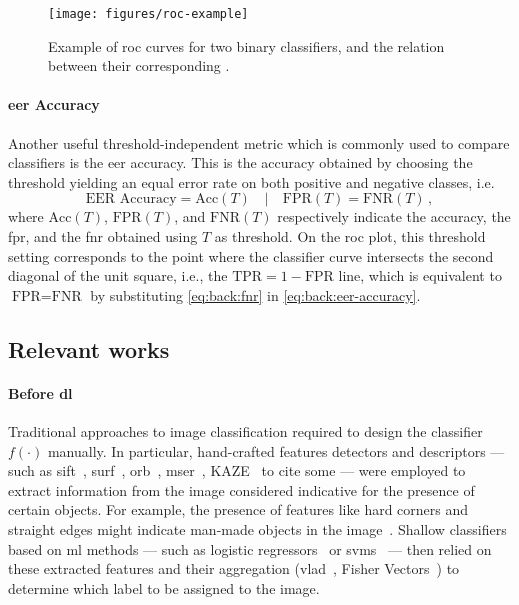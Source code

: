 \begin{figure}
    \centering
    \texttt{[image: figures/roc-example]}
    \caption{Example of \acrfull{roc} curves for two binary classifiers, and the relation between their corresponding .}
    \label{fig:back:roc}
\end{figure}

\paragraph{\acrshort{eer} Accuracy}
Another useful threshold-independent metric which is commonly used to compare classifiers is the \gls{eer} accuracy.
This is the accuracy obtained by choosing the threshold yielding an equal error rate on both positive and negative classes, i.e.
\begin{equation} \label{eq:back:eer-accuracy}
    \text{EER\ Accuracy} = \text{Acc}(T) \quad | \quad \text{FPR}(T) = \text{FNR}(T) \,,
\end{equation}
where $\text{Acc}(T)$, $\text{FPR}(T)$, and $\text{FNR}(T)$ respectively indicate the accuracy, the \gls{fpr}, and the \gls{fnr} obtained using $T$ as threshold.
On the \gls{roc} plot, this threshold setting corresponds to the point where the classifier curve intersects the second diagonal of the unit square, i.e., the $\text{TPR} = 1 - \text{FPR}$ line, which is equivalent to $\text{FPR} = \text{FNR}$ by substituting \ref{eq:back:fnr} in \ref{eq:back:eer-accuracy}.

\subsection{Relevant works}
\label{subsec:back:classif-relwork}

\paragraph{Before \acrlong{dl}}
Traditional approaches to image classification required to design the classifier $f(\cdot)$ manually.
In particular, hand-crafted features detectors and descriptors --- such as \acrshort{sift}~\cite{lowe2004distinctive}, \acrshort{surf}~\cite{bay2006surf}, \acrshort{orb}~\cite{rublee2011orb}, \acrshort{mser}~\cite{matas2004robust}, KAZE~\cite{alcantarilla2012kaze} to cite some --- were employed to extract information from the image considered indicative for the presence of certain objects.
For example, the presence of features like hard corners and straight edges might indicate man-made objects in the image~\cite{piccinini2012real}.
Shallow classifiers based on \gls{ml} methods --- such as logistic regressors~\cite{mensink2012metric} or \glspl{svm}~\cite{arandjelovic2012three} --- then relied on these extracted features and their aggregation (\gls{vlad}~\cite{jegou2010aggregating}, Fisher Vectors~\cite{perronnin2010improving}) to determine which label to be assigned to the image.

